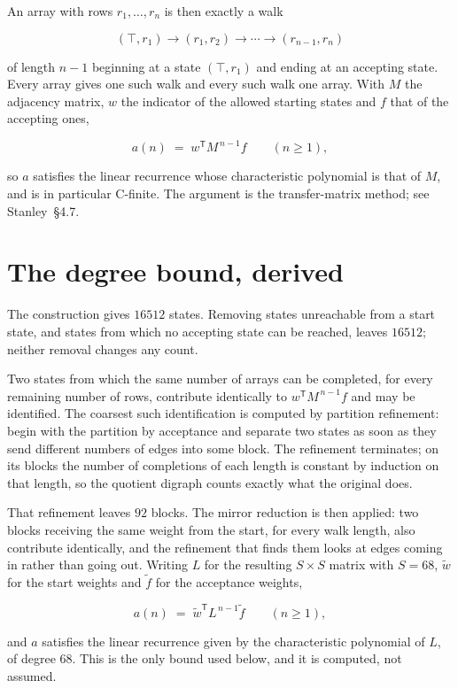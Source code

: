 \documentclass[11pt]{article}
\theoremstyle{definition}
\begin{document}
An array with rows $r_1,\dots,r_n$ is then exactly a walk

\[(\top,r_1) \to (r_1,r_2) \to \cdots \to (r_{n-1},r_n)\]

of length $n-1$ beginning at a state $(\top,r_1)$ and ending at an accepting state. Every array gives one such walk and every such walk one array. With $M$ the adjacency matrix, $w$ the indicator of the allowed starting states and $f$ that of the accepting ones,

\[a(n) \;=\; w^{\mathsf T} M^{\,n-1} f \qquad (n \ge 1),\]

so $a$ satisfies the linear recurrence whose characteristic polynomial is that of $M$, and is in particular C-finite. The argument is the transfer-matrix method; see Stanley~\S4.7.

\section{The degree bound, derived}

The construction gives $16512$ states. Removing states unreachable from a start state, and states from which no accepting state can be reached, leaves $16512$; neither removal changes any count.

Two states from which the same number of arrays can be completed, for every remaining number of rows, contribute identically to $w^{\mathsf T}M^{\,n-1}f$ and may be identified. The coarsest such identification is computed by partition refinement: begin with the partition by acceptance and separate two states as soon as they send different numbers of edges into some block. The refinement terminates; on its blocks the number of completions of each length is constant by induction on that length, so the quotient digraph counts exactly what the original does.

That refinement leaves $92$ blocks. The mirror reduction is then applied: two blocks receiving the same weight from the start, for every walk length, also contribute identically, and the refinement that finds them looks at edges coming in rather than going out. Writing $L$ for the resulting $S \times S$ matrix with $S = 68$, $\tilde w$ for the start weights and $\tilde f$ for the acceptance weights,

\[a(n) \;=\; \tilde w^{\mathsf T} L^{\,n-1} \tilde f \qquad (n \ge 1),\]

and $a$ satisfies the linear recurrence given by the characteristic polynomial of $L$, of degree $68$. This is the only bound used below, and it is computed, not assumed.
\end{document}
